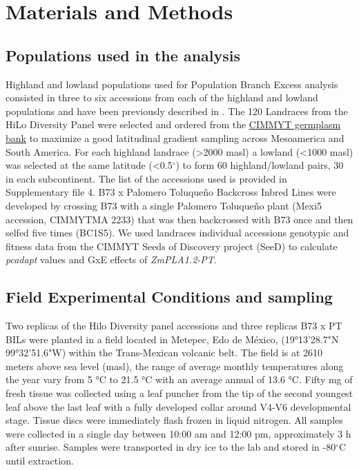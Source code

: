 \documentclass[9pt,twocolumn,twoside,lineno]{BioRxiv}
\begin{document}
\section{Materials and Methods}
\label{sec:materials:methods}
\subsection{Populations used in the analysis } 
Highland and lowland populations used for Population Branch Excess analysis consisted in three to six accessions from each of the highland and lowland populations and have been previously described in \cite{Wang2020-mp, Wang2017-bc}. 
The 120 Landraces from the HiLo Diversity Panel were selected and ordered from the \href{http://mgb.cimmyt.org/gringlobal/search.aspx}{CIMMYT germplasm bank} to maximize a good latitudinal gradient sampling across Mesoamerica and South America. For each highland landrace (>2000 masl) a lowland (<1000 masl) was selected at the same latitude (<0.5$^{\circ}$) to form 60 highland/lowland pairs, 30 in each subcontinent. 
The list of the accessions used is provided in Supplementary file 4.   
B73 x Palomero Toluqueño Backcross Inbred Lines were developed by crossing B73 with a single Palomero Toluqueño plant (Mexi5 accession, CIMMYTMA 2233) that was then backcrossed with B73 once and then selfed five times (BC1S5).  
We used landraces individual accessions genotypic and fitness data from the CIMMYT Seeds of Discovery project (SeeD) \cite{Gates2019-xu} to calculate \textit{pcadapt} \cite{Luu2017-ws} values and GxE effects of \textit{ZmPLA1.2-PT}.
\subsection{Field Experimental Conditions and sampling} 
Two replicas of the Hilo Diversity panel accessions and three replicas B73 x PT BILs were planted in a field located in Metepec, Edo de México, (19°13'28.7"N 99°32'51.6"W) within the Trans-Mexican volcanic belt. 
The field is at 2610 meters above sea level (masl), the range of average monthly temperatures along the year vary from 5 °C to 21.5 °C with an average annual of 13.6 °C.  
Fifty mg of fresh tissue was collected using a leaf puncher from the tip of the second youngest leaf above the last leaf with a fully developed collar around V4-V6 developmental stage. 
Tissue discs were immediately flash frozen in liquid nitrogen. 
All samples were collected in a single day between 10:00 am and 12:00 pm, approximately 3 h after sunrise. 
Samples were transported in dry ice to the lab and stored in -80$^{\circ}$C until extraction. 
\end{document}
